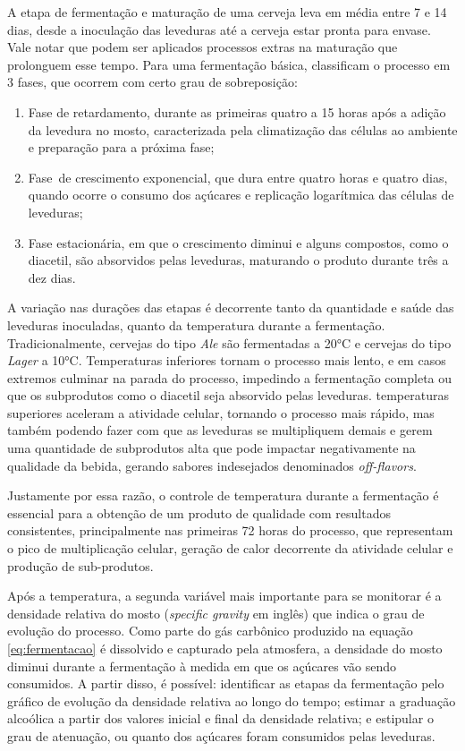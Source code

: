 A etapa de fermentação e maturação de uma cerveja leva em média entre 7 e 14 dias, desde a inoculação das leveduras até a cerveja estar pronta para envase. Vale notar que podem ser aplicados processos extras na maturação que prolonguem esse tempo.
Para uma fermentação básica,  classificam o processo em 3 fases, que ocorrem com certo grau de sobreposição:
\begin{enumerate}
    \item Fase de retardamento, durante as primeiras quatro a 15 horas após a adição
da levedura no mosto, caracterizada pela climatização das células ao
ambiente e preparação para a próxima fase;
    \item Fase de crescimento exponencial, que dura entre quatro horas e quatro dias,
quando ocorre o consumo dos açúcares e replicação logarítmica das células
de leveduras;
    \item Fase estacionária, em que o crescimento diminui e alguns compostos, como o diacetil, são
absorvidos pelas leveduras, maturando o produto durante três a dez dias.
\end{enumerate}

A variação nas durações das etapas é decorrente tanto da quantidade e saúde das leveduras inoculadas, quanto da temperatura 
durante a fermentação. Tradicionalmente, cervejas do tipo \textit{Ale} são fermentadas a 20°C e cervejas do tipo 
\textit{Lager} a 10°C. Temperaturas inferiores tornam o processo mais lento, e em casos extremos culminar na parada do processo, impedindo a fermentação completa ou que os subprodutos como o diacetil seja absorvido pelas leveduras. temperaturas superiores aceleram a atividade celular, tornando o processo mais rápido, mas também podendo fazer com que as leveduras se multipliquem demais e gerem uma quantidade de subprodutos alta que pode impactar negativamente na qualidade da bebida, gerando sabores indesejados denominados \textit{off-flavors}.

Justamente por essa razão, o controle de temperatura durante a fermentação é essencial para a obtenção de um produto de 
qualidade com resultados consistentes, principalmente nas primeiras 72 horas do processo, que representam o pico de multiplicação celular, geração de calor decorrente da atividade celular e produção de sub-produtos.

Após a temperatura, a segunda variável mais importante para se monitorar é a densidade relativa do mosto 
(\textit{specific gravity} em inglês) que indica o grau de evolução do processo. Como parte do gás carbônico produzido 
na equação \ref{eq:fermentacao} é dissolvido e capturado pela atmosfera, a densidade do mosto diminui durante a fermentação à
medida em que os açúcares vão sendo consumidos. A partir disso, é possível: identificar as etapas da fermentação pelo
gráfico de evolução da densidade relativa ao longo do tempo; estimar a graduação alcoólica a partir dos valores inicial e 
final da densidade relativa; e estipular o grau de atenuação, ou quanto dos açúcares foram consumidos pelas leveduras.

